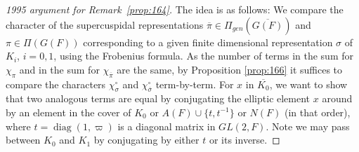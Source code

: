 \documentclass[12pt,letterpaper,openany]{book}
\theoremstyle{plain}
\theoremstyle{definition}
\theoremstyle{remark}
\theoremstyle{remark}
\begin{document}
\begin{proof}[1995 argument for Remark~\ref{prop:164}]
The idea is as follows:
We compare the character of the supercuspidal representations
$\overline{\pi}\in \Pi_{gen}(\overline{G(F)})$ and
$\pi\in\Pi(G(F))$ corresponding to a given finite dimensional representation
$\sigma$ of $K_i$, $i=0,1$, using the Frobenius formula.
As the number of terms in the sum for $\chi_\pi$ and in
the sum for $\chi_{\overline{\pi}}$ are the same, by
Proposition \ref{prop:166} it suffices to compare the
characters $\chi_\sigma^\circ$
and $\chi_{\overline{\sigma}}^\circ$ term-by-term.
For $x$ in $\overline{K_0}$,
we want to show that two analogous terms are equal by
conjugating the elliptic element $x$ around by an element in the cover of
$K_0$ or $A(F)\cup \{t,t^{-1}\}$ or $N(F)$ (in that order), where
$t=\operatorname{diag}(1,\varpi)$ is a diagonal matrix in $GL(2,F)$.
Note we may pass between $K_0$ and $K_1$ by conjugating by either
$t$ or its inverse.


\end{proof}
\end{document}
